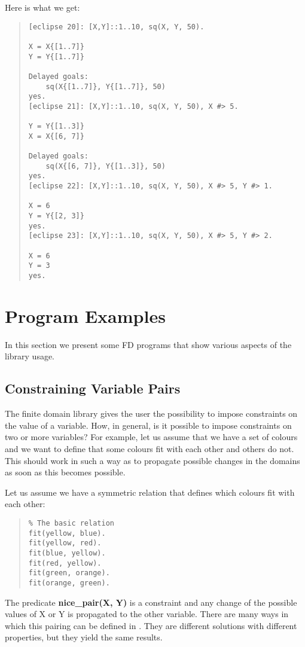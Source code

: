 Here is what we get:
\begin{quote}
\begin{verbatim}
[eclipse 20]: [X,Y]::1..10, sq(X, Y, 50).

X = X{[1..7]}
Y = Y{[1..7]}

Delayed goals:
	sq(X{[1..7]}, Y{[1..7]}, 50)
yes.
[eclipse 21]: [X,Y]::1..10, sq(X, Y, 50), X #> 5.

Y = Y{[1..3]}
X = X{[6, 7]}

Delayed goals:
	sq(X{[6, 7]}, Y{[1..3]}, 50)
yes.
[eclipse 22]: [X,Y]::1..10, sq(X, Y, 50), X #> 5, Y #> 1.

X = 6
Y = Y{[2, 3]}
yes.
[eclipse 23]: [X,Y]::1..10, sq(X, Y, 50), X #> 5, Y #> 2.

X = 6
Y = 3
yes.
\end{verbatim}
\end{quote}

\section{Program Examples}
In this section we present some FD programs that show various
aspects of the library usage.

\subsection{Constraining Variable Pairs}
The finite domain library gives the user the possibility
to impose constraints on the value of a variable.
How, in general, is it possible to impose constraints on two
or more variables?
For example, let us assume that we have a set of colours and we
want to define that some colours fit with each other and others do not.
This should work in such a way as to propagate possible changes
in the domains as soon as this becomes possible.


Let us assume we have a symmetric relation that defines which
colours fit with each other:
\begin{quote}
\begin{verbatim}
% The basic relation
fit(yellow, blue).
fit(yellow, red).
fit(blue, yellow).
fit(red, yellow).
fit(green, orange).
fit(orange, green).
\end{verbatim}
\end{quote}

The predicate {\bf nice_pair(X, Y)} is a constraint and any change of
the possible values of X or Y is propagated
to the other variable.
There are many ways in which this pairing can be defined in \eclipse.
They are different solutions with different properties, but
they yield the same results.

